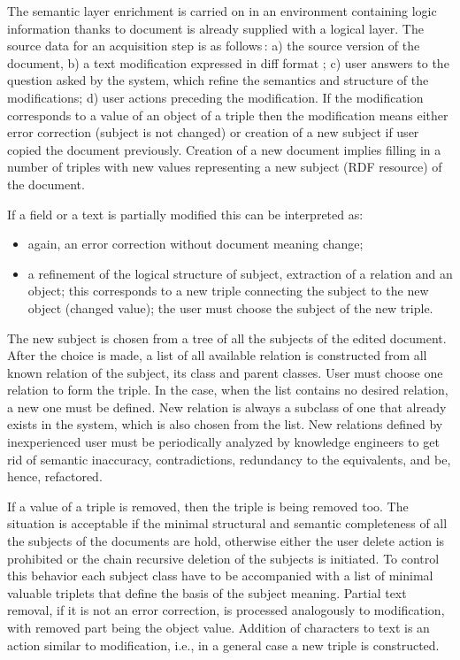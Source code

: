 \documentclass[conference]{IEEEtran}
\begin{document}
The semantic layer enrichment is carried on in an environment containing logic information thanks to document is already supplied with a logical layer. The source data for an acquisition step is as follows\,: a) the source version of the document, b) a text modification expressed in diff format \cite{b9}; c) user answers to the question asked by the system, which refine the semantics and structure of the modifications; d) user actions preceding the modification. If the modification corresponds to a value of an object of a triple then the modification means either error correction (subject is not changed) or creation of a new subject if user copied the document previously. Creation of a new document implies filling in a number of triples with new values representing a new subject (RDF resource) of the document.

If a field or a text is partially modified this can be interpreted as:
\begin{itemize}
\item again, an error correction without document meaning change;
\item a refinement of the logical structure of subject, extraction of a relation and an object; this corresponds to a new triple connecting the subject to the new object (changed value); the user must choose the subject of the new triple.
\end{itemize}

The new subject is chosen from a tree of all the subjects of the edited document. After the choice is made, a list of all available relation is constructed from all known relation of the subject, its class and parent classes. User must choose one relation to form the triple. In the case, when the list contains no desired relation, a new one must be defined. New relation is always a subclass of one that already exists in the system, which is also chosen from the list. New relations defined by inexperienced user must be periodically analyzed by knowledge engineers to get rid of semantic inaccuracy, contradictions, redundancy to the equivalents, and be, hence, refactored.

If a value of a triple is removed, then the triple is being removed too. The situation is acceptable if the minimal structural and semantic completeness of all the subjects of the documents are hold, otherwise either the user delete action is prohibited or the chain recursive deletion of the subjects is initiated. To control this behavior each subject class have to be accompanied with a list of minimal valuable triplets that define the basis of the subject meaning. Partial text removal, if it is not an error correction, is processed analogously to modification, with removed part being the object value. Addition of characters to text is an action similar to modification, i.e., in a general case a new triple is constructed.
\end{document}
